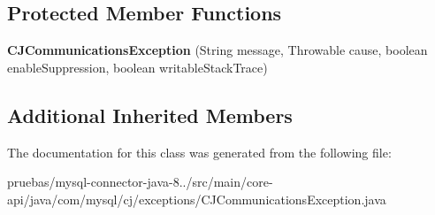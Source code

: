 \subsection*{Protected Member Functions}
\begin{DoxyCompactItemize}
\item 
\mbox{\label{classcom_1_1mysql_1_1cj_1_1exceptions_1_1_c_j_communications_exception_a0859031afd5e368f581dd0497175c132}} 
{\bfseries C\+J\+Communications\+Exception} (String message, Throwable cause, boolean enable\+Suppression, boolean writable\+Stack\+Trace)
\end{DoxyCompactItemize}
\subsection*{Additional Inherited Members}


The documentation for this class was generated from the following file\+:\begin{DoxyCompactItemize}
\item 
pruebas/mysql-\/connector-\/java-\/8../src/main/core-\/api/java/com/mysql/cj/exceptions/C\+J\+Communications\+Exception.\+java\end{DoxyCompactItemize}
